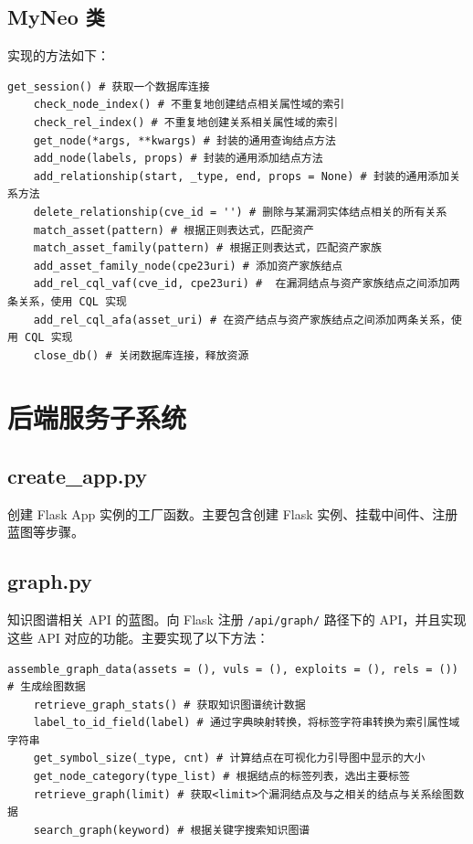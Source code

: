 \documentclass[a4paper,AutoFakeBold,oneside,12pt]{book}
\begin{document}
\subsection{MyNeo 类}

实现的方法如下：
\begin{lstlisting}[style = python]
	get_session() # 获取一个数据库连接
	check_node_index() # 不重复地创建结点相关属性域的索引
	check_rel_index() # 不重复地创建关系相关属性域的索引
	get_node(*args, **kwargs) # 封装的通用查询结点方法
	add_node(labels, props) # 封装的通用添加结点方法
	add_relationship(start, _type, end, props = None) # 封装的通用添加关系方法
	delete_relationship(cve_id = '') # 删除与某漏洞实体结点相关的所有关系
	match_asset(pattern) # 根据正则表达式，匹配资产
	match_asset_family(pattern) # 根据正则表达式，匹配资产家族
	add_asset_family_node(cpe23uri) # 添加资产家族结点
	add_rel_cql_vaf(cve_id, cpe23uri) #  在漏洞结点与资产家族结点之间添加两条关系，使用 CQL 实现
	add_rel_cql_afa(asset_uri) # 在资产结点与资产家族结点之间添加两条关系，使用 CQL 实现
	close_db() # 关闭数据库连接，释放资源
\end{lstlisting}

\section{后端服务子系统}

\subsection{create{\_}app.py}

创建 Flask App 实例的工厂函数。主要包含创建 Flask 实例、挂载中间件、注册蓝图等步骤。

\subsection{graph.py}

知识图谱相关 API 的蓝图。向 Flask 注册 \lstinline|/api/graph/| 路径下的 API，并且实现这些 API 对应的功能。主要实现了以下方法：
\begin{lstlisting}[style = python]
	assemble_graph_data(assets = (), vuls = (), exploits = (), rels = ()) # 生成绘图数据
	retrieve_graph_stats() # 获取知识图谱统计数据
	label_to_id_field(label) # 通过字典映射转换，将标签字符串转换为索引属性域字符串
	get_symbol_size(_type, cnt) # 计算结点在可视化力引导图中显示的大小
	get_node_category(type_list) # 根据结点的标签列表，选出主要标签
	retrieve_graph(limit) # 获取<limit>个漏洞结点及与之相关的结点与关系绘图数据
	search_graph(keyword) # 根据关键字搜索知识图谱
\end{lstlisting}
\end{document}
